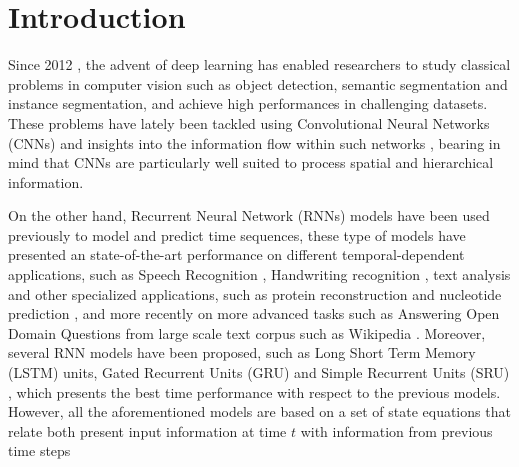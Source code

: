 \chapter{Introduction}
\label{introduction}
Since 2012 \cite{krizhevsky2012imagenet}, the advent of deep learning has enabled researchers to study classical problems in computer vision such as object detection, semantic segmentation and instance segmentation, and achieve high performances in challenging datasets. These problems have lately been tackled using Convolutional Neural Networks (CNNs) \cite{DBLP:journals/corr/LongSD14}\cite{zhao2017pspnet}\cite{he_mask_2017} and insights into the information flow within such networks \cite{DBLP:journals/corr/HeZRS15}\cite{DBLP:journals/corr/HuangLW16a}, bearing in mind that CNNs are particularly well suited to process spatial and hierarchical information. 

On the other hand, Recurrent Neural Network (RNNs) models have been used previously to model and predict time sequences, these type of models have presented an state-of-the-art performance on different temporal-dependent applications, such as Speech Recognition \cite{DBLP:journals/corr/abs-1303-5778}, Handwriting recognition \cite{DBLP:journals/corr/Graves13}, text analysis and other specialized applications, such as protein reconstruction and nucleotide prediction \cite{doi:10.1093/bioinformatics/btw678}, and more recently on more advanced tasks such as Answering Open Domain Questions from large scale text corpus such as Wikipedia \cite{chen2017reading}. Moreover, several RNN models have been proposed, such as Long Short Term Memory (LSTM) \cite{Hochreiter:1997:LSM:1246443.1246450} units, Gated Recurrent Units (GRU) \cite{DBLP:journals/corr/ChoMGBSB14} and Simple Recurrent Units (SRU) \cite{DBLP:journals/corr/abs-1709-02755}, which presents the best time performance with respect to the previous models. However, all the aforementioned models are based on a set of state equations that relate both present input information at time $t$ with information from previous time steps
